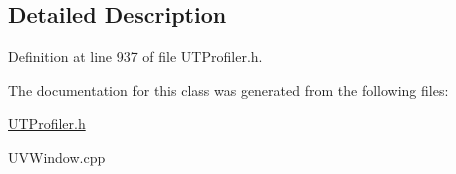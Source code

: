 \subsection{Detailed Description}


Definition at line 937 of file U\-T\-Profiler.\-h.



The documentation for this class was generated from the following files\-:\begin{DoxyCompactItemize}
\item 
\hyperlink{_u_t_profiler_8h}{U\-T\-Profiler.\-h}\item 
U\-V\-Window.\-cpp\end{DoxyCompactItemize}
